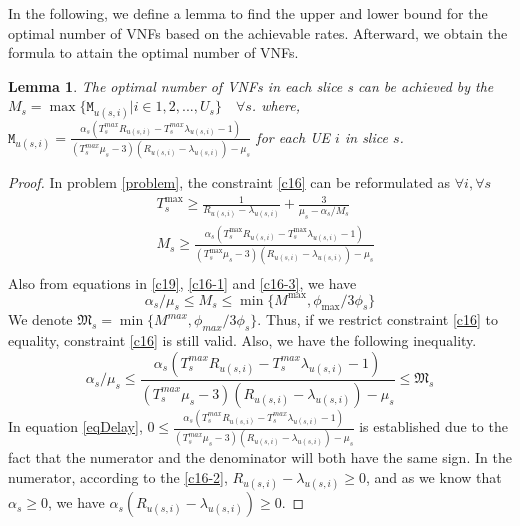 \documentclass[lettersize,journal]{IEEEtran}
\newtheorem{lemma}{Lemma}
\begin{document}
In the following, we define a lemma to find the upper and lower bound for the optimal number of VNFs based on the achievable rates. Afterward, we obtain the formula to attain the optimal number of VNFs.  
\begin{lemma}\label{lemma1}
The optimal number of VNFs in each slice s can be achieved by the 
$M_s = \max\{\mathtt{M}_{u(s,i)} | i \in 1,2,..., U_s\} \quad \forall s$.
where, $\mathtt{M}_{u(s,i)} = \frac{\alpha_s(T^{max}_s R_{u(s,i)}-T^{max}_s\lambda_{u(s,i)} -1)}{(T^{max}_s\mu_s-3)(R_{u(s,i)}-\lambda_{u(s,i)}) - \mu_s }$ for each UE $i$ in slice $s$.
\end{lemma}
\begin{proof}
In problem \eqref{problem}, the constraint \eqref{c16} can be reformulated as
$ \forall i,\forall s$
\begin{equation}
\begin{split}
&T^{\max}_s \geq\frac{1}{R_{u(s,i)} - \lambda_{u(s,i)}} + \frac{3}{\mu_s - \alpha_{s}/{M_s}}  \\
&M_s \geq \frac{\alpha_s(T^{\max}_s R_{u(s,i)}-T^{\max}_s\lambda_{u(s,i)} -1)}{(T^{\max}_s\mu_s-3)(R_{u(s,i)}-\lambda_{u(s,i)}) - \mu_s }\\
\end{split}
\end{equation}
Also from equations in \eqref{c19}, \eqref{c16-1} and \eqref{c16-3}, we have
\begin{equation}
\alpha_s/\mu_s\leq M_s \leq \min\{M^{\max}, \phi_{\max}/{3\phi_s}\}
\end{equation}
We denote $ \mathfrak{M}_s= \min\{M^{max}, \phi_{max}/{3\phi_s}\}$.
Thus, if we restrict constraint \eqref{c16} to equality, constraint \eqref{c16} is still valid.
Also, we have the following inequality.
\begin{equation}\label{eqDelay}
\alpha_s/\mu_s\leq \frac{\alpha_s(T^{max}_s R_{u(s,i)}-T^{max}_s\lambda_{u(s,i)} -1)}{(T^{max}_s\mu_s-3)(R_{u(s,i)}-\lambda_{u(s,i)}) - \mu_s } \leq \mathfrak{M}_s
\end{equation}
In equation \eqref{eqDelay}, $0\leq \frac{\alpha_s(T^{max}_s R_{u(s,i)}-T^{max}_s\lambda_{u(s,i)} -1)}{(T^{max}_s\mu_s-3)(R_{u(s,i)}-\lambda_{u(s,i)}) - \mu_s }$ is established due to the fact that 
the numerator and the denominator will both have the same sign.
In the numerator, according to the \eqref{c16-2}, $ R_{u(s,i)}-\lambda_{u(s,i)} \geq 0$, and as we know that $\alpha_s \geq 0$, we have $ \alpha_s (R_{u(s,i)}-\lambda_{u(s,i)}) \geq 0 $.

\end{proof}
\end{document}
